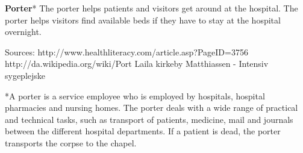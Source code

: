 \textbf{Porter}*
The porter helps patients and visitors get around at the hospital. The porter helps visitors find available beds if they have to stay at the hospital overnight. 

Sources:
http://www.healthliteracy.com/article.asp?PageID=3756
http://da.wikipedia.org/wiki/Port%
Laila kirkeby Matthiassen - Intensiv sygeplejske

*A porter is a service employee who is employed by hospitals, hospital pharmacies and nursing homes. The porter deals with a wide range of practical and technical tasks, such as transport of patients, medicine, mail and journals between the different hospital departments. If a patient is dead, the porter transports the corpse to the chapel.